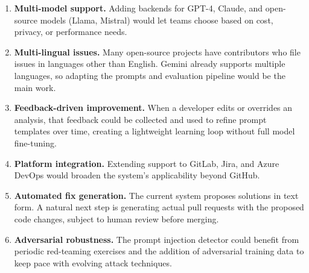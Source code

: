 \begin{enumerate}
\item \textbf{Multi-model support.} Adding backends for GPT-4, Claude, and open-source models (Llama, Mistral) would let teams choose based on cost, privacy, or performance needs.

\item \textbf{Multi-lingual issues.} Many open-source projects have contributors who file issues in languages other than English. Gemini already supports multiple languages, so adapting the prompts and evaluation pipeline would be the main work.

\item \textbf{Feedback-driven improvement.} When a developer edits or overrides an analysis, that feedback could be collected and used to refine prompt templates over time, creating a lightweight learning loop without full model fine-tuning.

\item \textbf{Platform integration.} Extending support to GitLab, Jira, and Azure DevOps would broaden the system's applicability beyond GitHub.

\item \textbf{Automated fix generation.} The current system proposes solutions in text form. A natural next step is generating actual pull requests with the proposed code changes, subject to human review before merging.

\item \textbf{Adversarial robustness.} The prompt injection detector could benefit from periodic red-teaming exercises and the addition of adversarial training data to keep pace with evolving attack techniques.
\end{enumerate}

